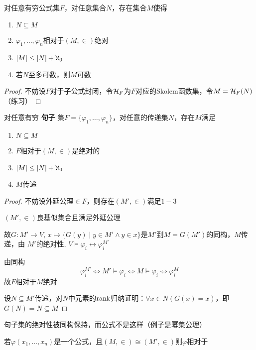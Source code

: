 \documentclass[11pt]{article}
\begin{document}
\begin{theorem}[ZFC]
对任意有穷公式集\(F\)，对任意集合\(N\)，存在集合\(M\)使得
\begin{enumerate}
\item \(N\subseteq M\)
\item \(\varphi_1,\dots,\varphi_n\)相对于\((M,\in)\)绝对
\item \(\abs{M}\le\abs{N}+\aleph_0\)
\item 若\(N\)至多可数，则\(M\)可数
\end{enumerate}
\end{theorem}

\begin{proof}
不妨设\(F\)对于子公式封闭，令\(\mathcal{H}_F\)为\(F\)对应的Skolem函数集，令\(M=\mathcal{H}_F(N)\) （练习）
\end{proof}

\begin{corollary}[ZFC]
对任意有穷 \textbf{句子} 集\(F=\{\varphi_1,\dots,\varphi_n\}\)，对任意的传递集\(N\)，存在\(M\)满足
\begin{enumerate}
\item \(N\subseteq M\)
\item \(F\)相对于\((M,\in)\)是绝对的
\item \(\abs{M}\le\abs{N}+\aleph_0\)
\item \(M\)传递
\end{enumerate}
\end{corollary}

\begin{proof}
不妨设外延公理\(\in F\)，则存在\((M',\in)\)满足\(1-3\)

\((M',\in)\)良基似集合且满足外延公理

故\(G:M'\to V\), \(x\mapsto\{G(y)\mid y\in M'\wedge y\in x\}\)是\(M'\)到\(M=G(M')\)的同构，\(M\)传递，由
\(M'\)的绝对性, \(V\vDash\varphi_i\leftrightarrow\varphi_i^{M'}\)

由同构
\begin{equation*}
\varphi_i^{M'}\Leftrightarrow M'\vDash\varphi_i\Leftrightarrow M\vDash\varphi_i\Leftrightarrow\varphi_i^M
\end{equation*}
故\(F\)相对于\(M\)绝对

设\(N\subseteq M'\)传递，对\(N\)中元素的\(\text{rank}\)归纳证明：\(\forall x\in N(G(x)=x)\)，即\(G(N)=N\subseteq M\)
\end{proof}

句子集的绝对性被同构保持，而公式不是这样（例子是幂集公理）

\begin{remark}
若\(\varphi(x_1,\dots,x_n)\)是一个公式，且\((M,\in)\cong(M',\in)\)则\(\varphi\)相对于
\end{remark}
\end{document}
